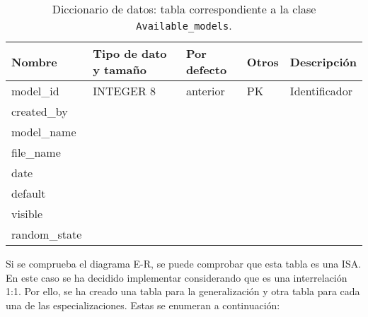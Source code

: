\begin{table}
	\small
	\begin{centering}
		\begin{tabular}{@{}p{6em} p{6em} p{6em} p{6em} p{6em}@{}}
			\toprule
			\textbf{Nombre} & \textbf{Tipo de dato y tamaño} & \textbf{Por defecto}& \textbf{Otros} & \textbf{Descripción}\\
			\midrule
			model\_id & INTEGER 8 & anterior & PK & Identificador \\
			created\_by &  &  &  &  \\
			model\_name &  &  &  &   \\
			file\_name &  &  &  &   \\
			date &  &  &  &   \\
			default &  &  &  &   \\
			visible &  &  &  &   \\
			random\_state &  &  &  &   \\
			\bottomrule
		\end{tabular}
	\end{centering}
	\caption[Diccionario de datos: Available\_models]{Diccionario de datos: tabla correspondiente a la clase \texttt{Available\_models}.}
	\label{datadic:models}
\end{table}

Si se comprueba el diagrama E-R, se puede comprobar que esta tabla es una ISA. En este caso se ha decidido implementar considerando que es una interrelación 1:1. Por ello, se ha creado una tabla para la generalización y otra tabla para cada una de las especializaciones. Estas se enumeran a continuación:

